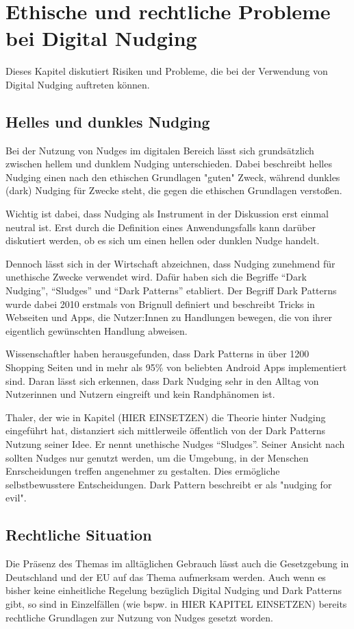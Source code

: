 \chapter{Ethische und rechtliche Probleme bei Digital Nudging}
Dieses Kapitel diskutiert Risiken und Probleme, die bei der Verwendung von Digital Nudging auftreten können.
\section{Helles und dunkles Nudging}
Bei der Nutzung von Nudges im digitalen Bereich lässt sich grundsätzlich zwischen hellem und dunklem Nudging unterschieden. Dabei beschreibt helles Nudging einen nach den ethischen Grundlagen "guten" Zweck, während dunkles (dark) Nudging für Zwecke steht, die gegen die ethischen Grundlagen verstoßen.

Wichtig ist dabei, dass Nudging als Instrument in der Diskussion erst einmal neutral ist. Erst durch die Definition eines Anwendungsfalls kann darüber diskutiert werden, ob es sich um einen hellen oder dunklen Nudge handelt.

Dennoch lässt sich in der Wirtschaft abzeichnen, dass Nudging zunehmend für unethische Zwecke verwendet wird. Dafür haben sich die Begriffe ``Dark Nudging'', ``Sludges'' und ``Dark Patterns'' etabliert. \parencite[S. 73-74]{Narayanan.2020} Der Begriff Dark Patterns wurde dabei 2010 erstmals von  Brignull definiert und beschreibt Tricks in Webseiten und Apps, die Nutzer:Innen zu Handlungen bewegen, die von ihrer eigentlich gewünschten Handlung abweisen. \parencite{Brignull.2010}

Wissenschaftler haben herausgefunden, dass Dark Patterns in über 1200 Shopping Seiten \parencite[S. 2]{Mathur.2019} und in mehr als 95\% von beliebten Android Apps \parencite[S. 5]{DiGeronimo.2020} implementiert sind. Daran lässt sich erkennen, dass Dark Nudging sehr in den Alltag von Nutzerinnen und Nutzern eingreift und kein Randphänomen ist.

Thaler, der wie in Kapitel (HIER EINSETZEN) die Theorie hinter Nudging eingeführt hat, distanziert sich mittlerweile öffentlich von der Dark Patterns Nutzung seiner Idee. Er nennt unethische Nudges ``Sludges''. Seiner Ansicht nach sollten Nudges nur genutzt werden, um die Umgebung, in der Menschen Enrscheidungen treffen angenehmer zu gestalten. Dies ermögliche selbstbewusstere Entscheidungen. Dark Pattern beschreibt er als "nudging for evil". \parencite{Thaler.2018}

\section{Rechtliche Situation}
Die Präsenz des Themas im alltäglichen Gebrauch lässt auch die Gesetzgebung in Deutschland und der \ac{EU} auf das Thema aufmerksam werden. Auch wenn es bisher keine einheitliche Regelung bezüglich Digital Nudging und Dark Patterns gibt, so sind in Einzelfällen (wie bspw. in HIER KAPITEL EINSETZEN) bereits rechtliche Grundlagen zur Nutzung von Nudges gesetzt worden.

